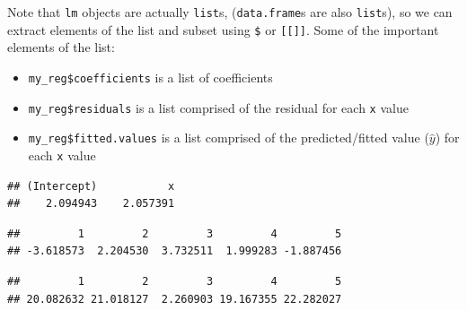 \documentclass[]{book}
\newenvironment{Shaded}{\begin{snugshade}}{\end{snugshade}}
\newcommand{\DecValTok}[1]{\textcolor[rgb]{0.00,0.00,0.81}{#1}}
\newcommand{\CommentTok}[1]{\textcolor[rgb]{0.56,0.35,0.01}{\textit{#1}}}
\newcommand{\OperatorTok}[1]{\textcolor[rgb]{0.81,0.36,0.00}{\textbf{#1}}}
\newcommand{\NormalTok}[1]{#1}
\providecommand{\tightlist}{%
  \setlength{\itemsep}{0pt}\setlength{\parskip}{0pt}}
\theoremstyle{definition}
\theoremstyle{definition}
\theoremstyle{definition}
\theoremstyle{remark}
\begin{document}
Note that \texttt{lm} objects are actually \texttt{list}s,
(\texttt{data.frame}s are also \texttt{list}s), so we can extract
elements of the list and subset using \texttt{\$} or
\texttt{{[}{[}{]}{]}}. Some of the important elements of the list:

\begin{itemize}
\tightlist
\item
  \texttt{my\_reg\$coefficients} is a list of coefficients
\item
  \texttt{my\_reg\$residuals} is a list comprised of the residual for
  each \texttt{x} value
\item
  \texttt{my\_reg\$fitted.values} is a list comprised of the
  predicted/fitted value (\(\hat{y}\)) for each \texttt{x} value
\end{itemize}

\begin{Shaded}
\end{Shaded}

\begin{verbatim}
## (Intercept)           x 
##    2.094943    2.057391
\end{verbatim}

\begin{Shaded}
\end{Shaded}

\begin{verbatim}
##         1         2         3         4         5 
## -3.618573  2.204530  3.732511  1.999283 -1.887456
\end{verbatim}

\begin{Shaded}
\end{Shaded}

\begin{verbatim}
##         1         2         3         4         5 
## 20.082632 21.018127  2.260903 19.167355 22.282027
\end{verbatim}
\end{document}
